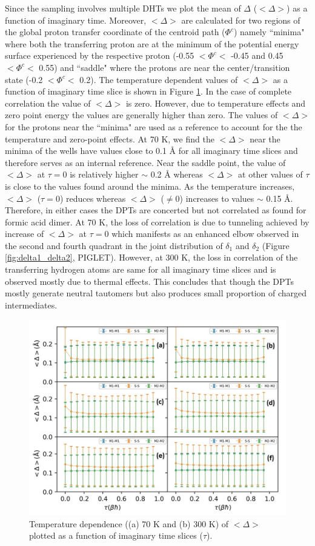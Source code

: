 Since the sampling involves multiple DHTs we plot the mean of $\Delta$ ($<\Delta>$) as a function of imaginary time. Moreover, $<\Delta>$ are calculated for two regions of the global proton transfer coordinate of the centroid path ($\Phi^c$) namely ``minima" where both the transferring proton are at the minimum of the potential energy surface experienced by the respective proton (-0.55 $ < \Phi^c < $ -0.45 and 0.45 $ < \Phi^c < $ 0.55) and ``saddle" where the protons are near the center/transition state (-0.2 $< \Phi^c <$ 0.2). The temperature dependent values of  $<\Delta>$ as a function of imaginary time slice is shown in Figure \ref{fig:imagine}. In the case of complete correlation the value of $<\Delta>$ is zero. However, due to temperature effects and zero point energy the values are generally higher than zero. The values of $<\Delta>$ for the protons near the ``minima" are used as a reference to account for the the temperature and zero-point effects. At 70 K, we find the $<\Delta>$ near the minima of the wells have values close to 0.1 \AA{} for all imaginary time slices and therefore serves as an internal reference. Near the saddle point, the value of $<\Delta>$ at $\tau=0$ is relatively higher $\sim$ 0.2 \AA{} whereas $<\Delta>$ at other values of $\tau$ is close to the values found around the minima. As the temperature increases, $<\Delta>$ ($\tau=0$) reduces whereas $<\Delta>$ ($\neq$0) increases to values $\sim$ 0.15 \AA{}. Therefore, in either cases the DPTs are concerted  but not correlated as found for formic acid dimer\cite{ivanov2015quantum}. At 70 K, the loss of correlation is due to tunneling achieved by increase of $<\Delta>$ at $\tau=0$ which manifests as an enhanced elbow observed in the second and fourth quadrant in the joint distribution of $\delta_1$ and $\delta_2$ (Figure \ref{fig:delta1_delta2}, PIGLET). However, at 300 K, the loss in correlation of the transferring hydrogen atoms are same for all imaginary time slices and is observed mostly due to thermal effects. This concludes that though the DPTs mostly generate neutral tautomers but also produces small proportion of charged intermediates.

\begin{figure}
    \centering
    \includegraphics[width=15cm ]{./Appendix4/new_figures_si/imagine.jpg}
    \caption{Temperature dependence ((a) 70 K and (b) 300 K) of $<\Delta>$ plotted as a function of imaginary time slices ($\tau$).}
    \label{fig:imagine}
\end{figure}
